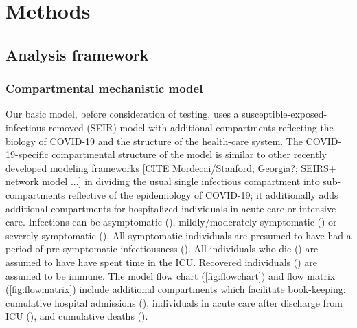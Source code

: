 \documentclass[12pt]{article}\usepackage[]{graphicx}\usepackage[]{color}
\begin{document}
\section{Methods}

\subsection{Analysis framework}

\subsubsection*{Compartmental mechanistic model}

Our basic model, before consideration of testing, uses
a susceptible-exposed-infectious-removed (SEIR) model with
additional compartments reflecting the biology of COVID-19 and the
structure of the health-care system. The COVID-19-specific compartmental structure
of the model is similar to other recently developed modeling frameworks
[CITE Mordecai/Stanford; Georgia?; SEIRS+ network model ...] in dividing
the usual single infectious compartment into sub-compartments reflective
of the epidemiology of COVID-19; it additionally adds
additional compartments for hospitalized individuals in acute care
or intensive care.  Infections can be
asymptomatic (), mildly/moderately symptomatic () or
severely symptomatic ().  All symptomatic individuals are
presumed to have had a period of pre-symptomatic infectiousness
().  All individuals who die () are assumed to have
have spent time in the ICU.  Recovered individuals () are
assumed to be immune.  The model flow chart
(\cref{fig:flowchart}) and flow matrix (\cref{fig:flowmatrix})
include additional compartments which facilitate book-keeping:
cumulative hospital admissions (), individuals in acute care
after discharge from ICU (), and cumulative deaths
().
\end{document}
